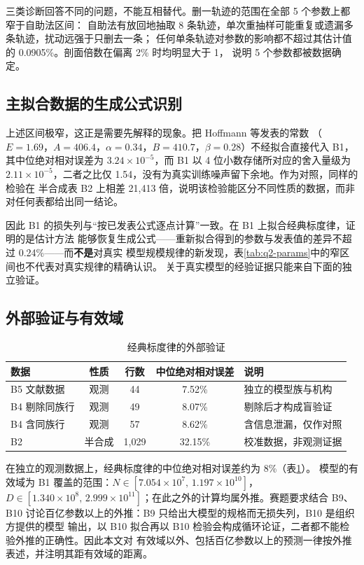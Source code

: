 三类诊断回答不同的问题，不能互相替代。删一轨迹的范围在全部 5 个参数上都窄于自助法区间：
自助法有放回地抽取 8 条轨迹，单次重抽样可能重复或遗漏多条轨迹，扰动远强于只删去一条；
任何单条轨迹对参数的影响都不超过其估计值的 0.0905\%。剖面倍数在偏离 2\% 时均明显大于 1，
说明 5 个参数都被数据确定。

\subsection{主拟合数据的生成公式识别}
\label{sec:q2-generator}

上述区间极窄，这正是需要先解释的现象。把 Hoffmann 等\cite{hoffmann2022chinchilla}发表的常数
（$E=1.69$，$A=406.4$，$\alpha=0.34$，$B=410.7$，$\beta=0.28$）不经拟合直接代入 B1，
其中位绝对相对误差为 $3.24\times10^{-5}$，而 B1 以 4 位小数存储所对应的舍入量级为
$2.11\times10^{-5}$，二者之比仅 1.54，没有为真实训练噪声留下余地。作为对照，同样的检验在
半合成表 B2 上相差 21,413 倍，说明该检验能区分不同性质的数据，而非对任何表都给出同一结论。

因此 B1 的损失列与“按已发表公式逐点计算”一致。在 B1 上拟合经典标度律，证明的是估计方法
能够恢复生成公式——重新拟合得到的参数与发表值的差异不超过 0.24\%——而\textbf{不是}对真实
模型规模规律的新发现，表\ref{tab:q2-params}中的窄区间也不代表对真实规律的精确认识。
关于真实模型的经验证据只能来自下面的独立验证。

\subsection{外部验证与有效域}
\label{sec:q2-validity}

\begin{table}[htbp]
  \centering
  \caption{经典标度律的外部验证}
  \label{tab:q2-validation}
  \begin{tabular}{lcccl}
    \toprule
    数据 & 性质 & 行数 & 中位绝对相对误差 & 说明 \\
    \midrule
    B5 文献数据 & 观测 & 44 & 7.52\% & 独立的模型族与机构 \\
    B4 剔除同族行 & 观测 & 49 & 8.07\% & 剔除后才构成盲验证 \\
    B4 含同族行 & 观测 & 57 & 8.62\% & 含信息泄漏，仅作对照 \\
    B2 & 半合成 & 1,029 & 32.15\% & 校准数据，非观测证据 \\
    \bottomrule
  \end{tabular}
\end{table}

在独立的观测数据上，经典标度律的中位绝对相对误差约为 8\%（表\ref{tab:q2-validation}）。
模型的有效域为 B1 覆盖的范围：$N\in[7.054\times10^{7},\,1.197\times10^{10}]$，
$D\in[1.340\times10^{8},\,2.999\times10^{11}]$；在此之外的计算均属外推。赛题要求结合
B9、B10 讨论百亿参数以上的外推：B9 只给出大模型的规格而无损失列，B10 是组织方提供的模型
输出，以 B10 拟合再以 B10 检验会构成循环论证，二者都不能检验外推的正确性。因此本文对
有效域以外、包括百亿参数以上的预测一律按外推表述，并注明其距有效域的距离。


